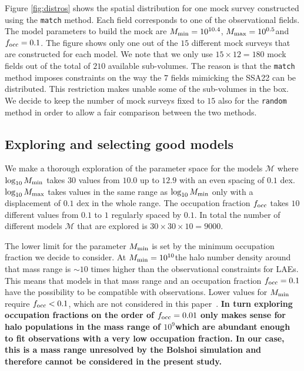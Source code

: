 \documentclass[usenatbib]{mn2e}
\newcommand{\documentname}{paper~}
\newcommand{\hMsun}{{\ifmmode{h^{-1}{\rm
        {M_{\odot}}}}\else{$h^{-1}{\rm{M_{\odot}}}$}\fi}}
\begin{document}
Figure \ref{fig:distros} shows the spatial distribution for one mock
survey constructed using the {\texttt{match}} method. Each field
corresponds to one of the observational fields. The model parameters
to build the mock are $M_{\rm min}=10^{10.4}$\hMsun, $M_{\rm
  max}=10^{0.5}$\hMsun and $f_{\rm occ}=0.1$. The figure shows only
one out of the $15$ different mock surveys that are constructed for
each model. We note that we only use $15\times 12=180$ mock fields out of the
total of $210$ available sub-volumes. The reason is that the {\texttt{match}}
method imposes constraints on the way the $7$ fields mimicking the
SSA22 can be distributed. This restriction makes unable some of the
sub-volumes in the box. We decide to keep the number of mock surveys
fixed to $15$ also for the {\texttt{random}} method in order to allow a
fair comparison between the two methods.

\subsection{Exploring and selecting good models}

We make a thorough exploration of the parameter space for the models
${\mathcal M}$ where $\log_{10} M_{\rm min}$ takes $30$ values from $10.0$ up
to $12.9$ with an even spacing of $0.1$ dex. $\log_{10} M_{\rm max}$
takes values in the same range as $\log_{10}M_{\rm min}$ only with a
displacement of $0.1$ dex in the whole range. The occupation fraction
$f_{\rm occ}$ takes $10$ different values from $0.1$ to $1$ regularly
spaced by $0.1$. In total the number of different models ${\mathcal
  M}$ that are explored is $30 \times 30 \times 10 = 9000$.  

The lower limit for the parameter $M_{\rm min}$ is set by the minimum
occupation fraction we decide to consider. At $M_{\rm
  min}=10^{10}$\hMsun the halo number density around that mass range
is $\sim 10$ times higher than the observational constraints
for LAEs. This means that models in that mass range and an occupation fraction $f_{\rm  occ}=0.1$ have the possibility to be compatible with
observations. Lower values for $M_{\rm min}$ require $f_{\rm
  occ}<0.1$, which are not considered in this \documentname.  {\bf In
  turn exploring occupation fractions on the order of $f_{\rm occ}=0.01$ 
  only makes sense for halo populations in the mass range of
  $10^{9}$\hMsun which are abundant enough to fit observations with a
  very low occupation fraction. In our case, this is a mass range unresolved
  by the Bolshoi simulation and therefore cannot be considered in the
  present study.}
\end{document}
